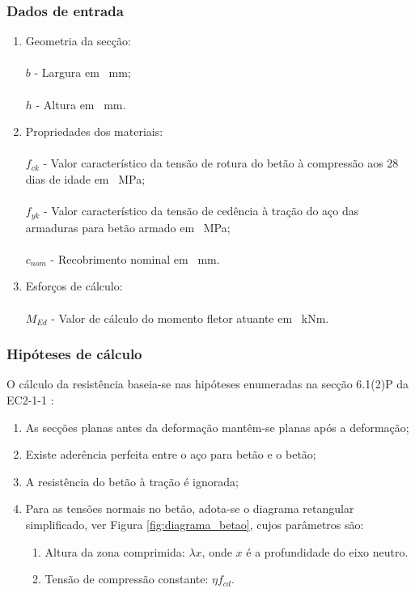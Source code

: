\subsubsection{Dados de entrada}
\begin{enumerate}
    \item Geometria da secção:\\\\
    $b$ - Largura em \SI{}{mm};\\\\
    $h$ - Altura em \SI{}{mm}.
    \item Propriedades dos materiais:\\\\
    $f_{ck}$ - Valor característico da tensão de rotura do betão à compressão aos 28 dias de idade em \SI{}{MPa};\\\\ 
    $f_{yk}$ - Valor característico da tensão de cedência à tração do aço das armaduras para betão armado em \SI{}{MPa};\\\\ 
    $c_{nom}$ - Recobrimento nominal em \SI{}{mm}.
    \item Esforços de cálculo:\\\\
    $M_{Ed}$ - Valor  de cálculo do momento fletor atuante em \SI{}{kNm}.
\end{enumerate}

\subsubsection{Hipóteses de cálculo}
O cálculo da resistência baseia-se nas hipóteses enumeradas na secção 6.1(2)P da EC2-1-1 \cite{EN1992,AppletonGomes}:
\begin{enumerate}
    \item As secções planas antes da deformação mantêm-se planas após a deformação;
    \item Existe aderência perfeita entre o aço para betão e o betão;
    \item A resistência do betão à tração é ignorada;
    \item Para as tensões normais no betão, adota-se o diagrama retangular simplificado, ver Figura \ref{fig:diagrama_betao}, cujos parâmetros são:
    \begin{enumerate}
        \item Altura da zona comprimida: $\lambda x$, onde $x$ é a profundidade do eixo neutro.
        \item Tensão de compressão constante: $\eta f_{cd}$.
    \end{enumerate}

\end{enumerate}

